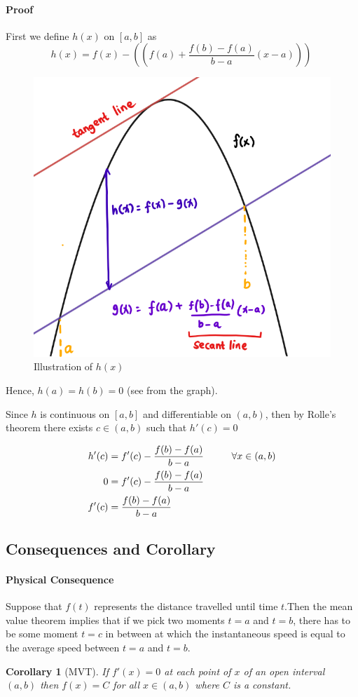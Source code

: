 \documentclass[12pt]{article}
\newcommand\tab[1][1cm]{\hspace*{#1}}
\newtheorem{corollary}{Corollary}
\begin{document}
\paragraph{Proof}
First we define $h(x)$ on $[a,b]$ as
\[
  h(x) = f(x) - ((f(a) + \frac{f(b) - f(a)}{b - a}(x - a) ))\, 
\]
\begin{figure} [h!]
    \centering
    \includegraphics[width = 0.35\linewidth]{Images/mvt proof.png}
    \caption{Illustration of $h(x)$}
\end{figure}
Hence, $h(a) = h(b) = 0$ (see from the graph).

Since $h$ is continuous on $[a,b]$ and differentiable on $(a,b)$, then by 
Rolle's theorem there exists $c \in (a,b)$ such that $h'(c) = 0$

\begin{align*} 
     h'(c) &= f'(c) - \frac{f(b) - f(a)}{b - a}  \textrm{\tab} \forall x \in (a,b)\\
    0 &= f'(c) - \frac{f(b) - f(a)}{b - a}\\
    f'(c) &= \frac{f(b) - f(a)}{b - a} \\
\end{align*}

\subsection{Consequences and Corollary}
\paragraph{Physical Consequence}
Suppose that $f(t)$ represents the distance travelled until time $t$.Then the mean value 
theorem implies that if we pick two moments $t = a$ and $t = b$, there has to be some moment 
$t = c$ in between at which the instantaneous speed is equal to the average speed between $t = a$ and $t = b$.

\begin{corollary}[MVT] 
     If $f'(x) = 0$ at each point of $x$ of an open interval  $(a,b)$ then $f(x) = C$ 
     for all $x \in (a,b)$ where $C$ is a constant.
\end{corollary}
\end{document}
